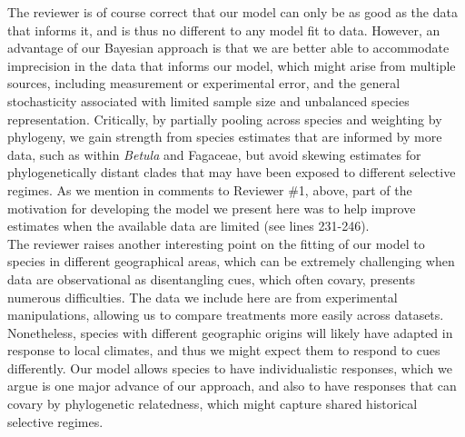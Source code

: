 \documentclass[11pt]{article}
\begin{document}
The reviewer is of course correct that our model can only be as good as the data that informs it, and is thus no different to any model fit to data. However, an advantage of our Bayesian approach is that we are better able to accommodate imprecision in the data that informs our model, which might arise from multiple sources, including measurement or experimental error, and the general stochasticity associated with limited sample size and unbalanced species representation. Critically, by partially pooling across species and weighting by phylogeny, we gain strength from species estimates that are informed by more data, such as within \emph{Betula} and Fagaceae, but avoid skewing estimates for phylogenetically distant clades that may have been exposed to different selective regimes. As we mention in comments to Reviewer \#1, above, part of the motivation for developing the model we present here was to help improve estimates when the available data are limited (see lines 231-246).   %
\\

The reviewer raises another interesting point on the fitting of our model to species in different geographical areas, which can be extremely challenging when data are observational as disentangling cues, which often covary, presents numerous difficulties. The data we include here are from experimental manipulations, allowing us to compare treatments more easily across datasets. Nonetheless, species with different geographic origins will likely have adapted in response to local climates, and thus we might expect them to respond to cues differently. Our model allows species to have individualistic responses, which we argue is one major advance of our approach, and also to have responses that can covary by phylogenetic relatedness, which might capture shared historical selective regimes.\\   
\end{document}
